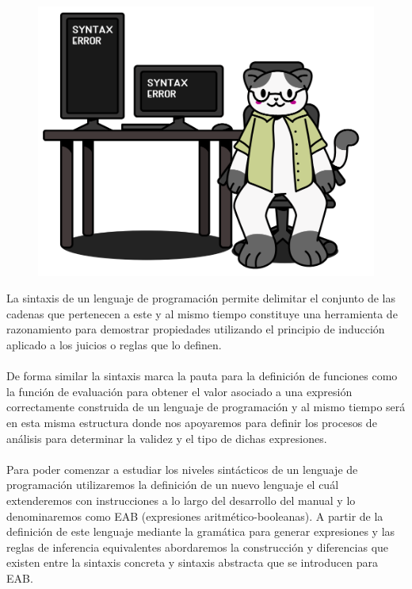 
\begin{figure}[htbp]
    \centerline{\includegraphics[scale=.45]{assets/03_gatito_sintaxis.PNG}}       
\end{figure}


La sintaxis de un lenguaje de programación permite delimitar el conjunto de las cadenas que pertenecen a este y al mismo tiempo constituye una herramienta de razonamiento para demostrar propiedades utilizando el principio de inducción aplicado a los juicios o reglas que lo definen. \\\\
De forma similar la sintaxis marca la pauta para la definición de funciones como la función de evaluación para obtener el valor asociado a una expresión correctamente construida de un lenguaje de programación y al mismo tiempo será en esta misma estructura donde nos apoyaremos para definir los procesos de análisis para determinar la validez y el tipo de dichas expresiones.\\\\
Para poder comenzar a estudiar los niveles sintácticos de un lenguaje de programación utilizaremos la definición de un nuevo lenguaje el cuál extenderemos con instrucciones a lo largo del desarrollo del manual y lo denominaremos como \textsf{EAB} (expresiones aritmético-booleanas). A partir de la definición de este lenguaje mediante la gramática para generar expresiones y las reglas de inferencia equivalentes abordaremos la construcción y diferencias que existen entre la sintaxis concreta y sintaxis abstracta que se introducen para \textsf{EAB}.\\

